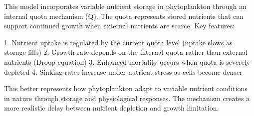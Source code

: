 This model incorporates variable nutrient storage in phytoplankton through an internal quota mechanism (Q). The quota represents stored nutrients that can support continued growth when external nutrients are scarce. Key features:

1. Nutrient uptake is regulated by the current quota level (uptake slows as storage fills)
2. Growth rate depends on the internal quota rather than external nutrients (Droop equation)
3. Enhanced mortality occurs when quota is severely depleted
4. Sinking rates increase under nutrient stress as cells become denser

This better represents how phytoplankton adapt to variable nutrient conditions in nature through storage and physiological responses. The mechanism creates a more realistic delay between nutrient depletion and growth limitation.
